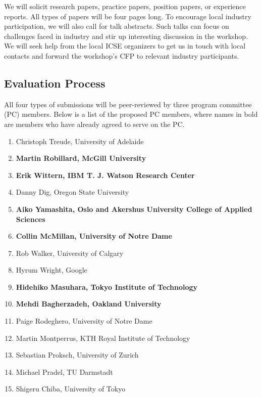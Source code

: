 \documentclass[10pt, conference]{IEEEtran}
\begin{document}
We will solicit research papers, practice papers, position papers, or experience reports. All types of papers will be four pages long. To encourage local industry participation, we will also call for talk abstracts. Such talks can focus on challenges faced in industry and stir up interesting discussion in the workshop. We will seek help from the local ICSE organizers to get us in touch with local contacts and forward the workshop's CFP to relevant industry participants.

\subsection{Evaluation Process}
All four types of submissions will be peer-reviewed by three program committee (PC) members. Below is a list of the proposed PC members, where names in bold are members who have already agreed to serve on the PC\@.

\begin{enumerate}
\setlength\itemsep{5pt}
\item Christoph Treude, University of Adelaide
\item \textbf{Martin Robillard, McGill University}
\item \textbf{Erik Wittern, IBM T. J. Watson Research Center}
\item Danny Dig, Oregon State University
\item \textbf{Aiko Yamashita, Oslo and Akershus University College of Applied Sciences}
\item \textbf{Collin McMillan, University of Notre Dame}
\item Rob Walker, University of Calgary
\item Hyrum Wright, Google
\item \textbf{Hidehiko Masuhara, Tokyo Institute of Technology}
\item \textbf{Mehdi Bagherzadeh, Oakland University}
\item Paige Rodeghero, University of Notre Dame
\item Martin Montperrus, KTH Royal Institute of Technology
\item Sebastian Proksch, University of Zurich
\item Michael Pradel, TU Darmstadt
\item Shigeru Chiba, University of Tokyo
\end{enumerate}
\end{document}
